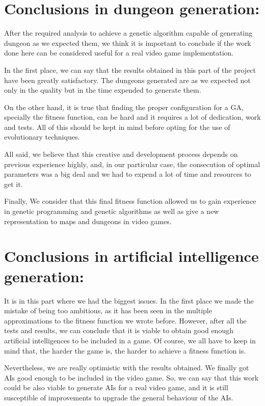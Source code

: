 \section{Conclusions in dungeon generation:}
After the required analysis to achieve a genetic algorithm capable of generating dungeon as we expected them, we think it is important to conclude if the work done here can be considered useful for a real video game implementation.\par
In the first place, we can say that the results obtained in this part of the project have been greatly satisfactory. The dungeons generated are as we expected not only in the quality but in the time expended to generate them.\par
On the other hand, it is true that finding the proper configuration for a GA, specially the fitness function, can be hard and it requires a lot of dedication, work and tests. All of this should be kept in mind before opting for the use of evolutionary techniques.\par
All said, we believe that this creative and development process depends on previous experience highly, and, in our particular case, the consecution of optimal parameters was a big deal and we had to expend a lot of time and resources to get it.\par
Finally, We consider that this final fitness function allowed us to gain experience in genetic programming and genetic algorithms as well as give a new representation to maps and dungeons in video games.\par
\section{Conclusions in artificial intelligence generation:}
It is in this part where we had the biggest issues. In the first place we made the mistake of being too ambitious, as it has been seen in the multiple approximations to the fitness function we wrote before. However, after all the tests and results, we can conclude that it is viable to obtain good enough artificial intelligences to be included in a game. Of course, we all have to keep in mind that, the harder the game is, the harder to achieve a fitness function is.\par
Nevertheless, we are really optimistic with the results obtained. We finally got AIs good enough to be included in the video game. So, we can say that this work could be also viable to generate AIs for a real video game, and it is still susceptible of improvements to upgrade the general behaviour of the AIs.\par
